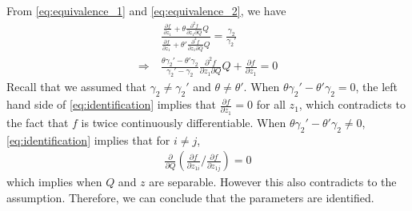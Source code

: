 \documentclass[11pt]{article}
\begin{document}
From \eqref{eq:equivalence_1} and \eqref{eq:equivalence_2}, we have
\begin{align}\label{eq:identification}
    &\frac{\frac{\partial f}{\partial z_1} + \theta \frac{\partial^2 f}{\partial z_1\partial Q}Q}{\frac{\partial f}{\partial z_1} + \theta' \frac{\partial^2 f}{\partial z_1\partial Q}Q} = \frac{\gamma_2}{\gamma_2'}\nonumber\\
    \Longrightarrow\ & \frac{\theta \gamma_2' - \theta' \gamma_2}{\gamma_2' - \gamma_2}\frac{\partial^2 f}{\partial z_1\partial Q}Q  +    \frac{\partial f}{\partial z_1} = 0
\end{align}
Recall that we assumed that $\gamma_2\ne \gamma_2'$ and $\theta\ne \theta'$. When $ \theta \gamma_2' - \theta' \gamma_2 = 0$, the left hand side of \eqref{eq:identification} implies that $\frac{\partial f}{\partial z_1} = 0$ for all $z_1$, which contradicts to the fact that $f$ is twice continuously differentiable. When  $ \theta \gamma_2' - \theta' \gamma_2 \ne 0$, \eqref{eq:identification} implies that for $i \ne j$, 
\begin{align}
    \frac{\partial }{\partial Q}\left( {\frac{\partial f}{\partial z_{1i}}}/{\frac{\partial f}{\partial z_{1j}}}    \right) = 0
\end{align}
which implies when $Q$ and $z$ are separable. However this also contradicts to the assumption.
Therefore, we can conclude that the parameters are identified.









\end{document}
